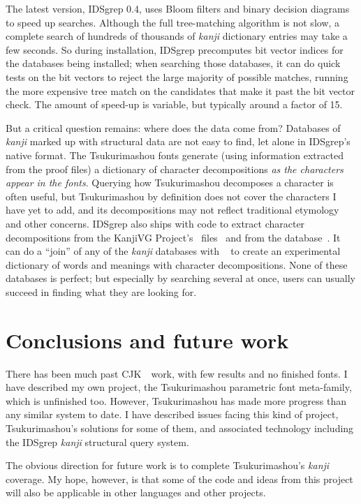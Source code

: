 \documentclass{ltugboat}
\def\CJK{CJK}
\begin{document}
The latest version, IDSgrep 0.4, uses Bloom filters and binary decision
diagrams to speed up searches.  Although the full tree-matching algorithm is
not slow, a complete search of hundreds of thousands of \emph{kanji}
dictionary entries may take a few seconds.  So during installation, IDSgrep
precomputes bit vector indices for the databases being installed;
when searching those databases, it can do quick tests on the bit
vectors to reject the large majority of possible matches, running the more
expensive tree match on the candidates that make it past the bit vector
check.  The amount of speed-up is variable, but typically around a factor of
15.

But a critical question remains:  where does the data come from?  Databases
of \emph{kanji} marked up with structural data are not easy to find, let
alone in IDSgrep's native format.  The Tsukurimashou fonts generate (using
information extracted from the proof files) a dictionary of character
decompositions \emph{as the characters appear in the fonts}.  Querying how
Tsukurimashou decomposes a character is often useful, but Tsukurimashou by
definition does not cover the characters I have yet to add, and its
decompositions may not reflect traditional etymology and other concerns. 
IDSgrep also ships with code to extract  character decompositions
from the KanjiVG Project's \XML\ files~\cite{KanjiVG} and from the 
 database~\cite{CHISE}.  It can do a ``join'' of any of the
\emph{kanji} databases with ~\cite{EDICT2} to create an
experimental dictionary of words and meanings with character decompositions. 
None of these databases is perfect; but especially by searching several at
once, users can usually succeed in finding what they are looking for.


\section{Conclusions and future work}

There has been much past \CJK\ \MF\ work, with few results and no finished
fonts.  I have described my own project, the Tsukurimashou parametric font
meta-family, which is unfinished too.  However, Tsukurimashou has made more
progress than any similar system to date.  I have described issues facing
this kind of project, Tsukurimashou's solutions for some of them, and
associated technology including the IDSgrep \emph{kanji} structural query
system.

The obvious direction for future work is to complete Tsukurimashou's
\emph{kanji} coverage.  My hope, however, is that some of the code and ideas
from this project will also be applicable in other languages and other
projects.





\makesignature
\end{document}
